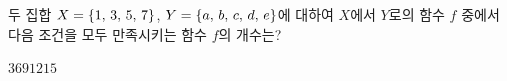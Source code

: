 \hspace*{2mm}\begin{minipage}[t]{\dimexpr\linewidth-2mm\relax}\vspace{0pt}
두 집합 $X=\{1,\mkern3mu 3,\mkern3mu 5,\mkern3mu 7\}$, $Y=\{a,\mkern3mu b,\mkern3mu c,\mkern3mu d,\mkern3mu e\}$에 대하여 $X$에서 $Y$로의 함수 $f$ 중에서 다음 조건을 모두 만족시키는 함수 $f$의 개수는? 
\begin{choices32}{$3$}{$6$}{$9$}{$12$}{$15$}\end{choices32}\end{minipage}
